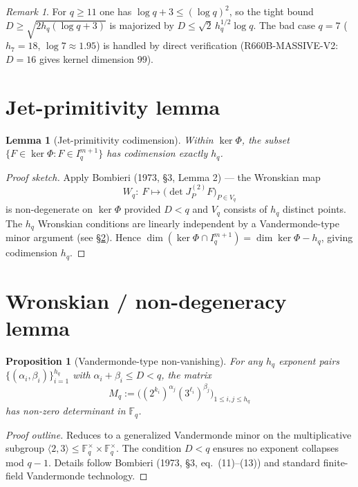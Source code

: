 \documentclass[12pt]{amsart}
\newtheorem{lemma}{Lemma}
\newtheorem{proposition}{Proposition}
\theoremstyle{definition}
\theoremstyle{remark}
\newtheorem{remark}{Remark}
\begin{document}
\begin{remark}
For $q \ge 11$ one has $\log q + 3 \le (\log q)^2$, so the tight
bound $D \ge \sqrt{2 h_q (\log q + 3)}$ is majorized by
$D \le \sqrt{2}\, h_q^{1/2} \log q$. The bad case $q = 7$ ($h_7 = 18$,
$\log 7 \approx 1.95$) is handled by direct verification
(R660B-MASSIVE-V2: $D = 16$ gives kernel dimension $99$).
\end{remark}

\section{Jet-primitivity lemma}

\begin{lemma}[Jet-primitivity codimension]\label{lem:primitive}
Within $\ker\Phi$, the subset
$\{F \in \ker\Phi : F \in I_q^{m+1}\}$
has codimension exactly $h_q$.
\end{lemma}

\begin{proof}[Proof sketch]
Apply Bombieri (1973, \S3, Lemma 2) — the Wronskian map
$$
W_q :\ F \mapsto \bigl(\det J^{(2)}_P F\bigr)_{P \in V_q}
$$
is non-degenerate on $\ker\Phi$ provided $D < q$ and $V_q$ consists of
$h_q$ distinct points. The $h_q$ Wronskian conditions are linearly
independent by a Vandermonde-type minor argument (see \S\ref{sec:wronskian}).
Hence $\dim(\ker\Phi \cap I_q^{m+1}) = \dim\ker\Phi - h_q$, giving
codimension $h_q$.
\qedhere
\end{proof}

\section{Wronskian / non-degeneracy lemma}
\label{sec:wronskian}

\begin{proposition}[Vandermonde-type non-vanishing]
For any $h_q$ exponent pairs $\{(\alpha_i, \beta_i)\}_{i=1}^{h_q}$ with
$\alpha_i + \beta_i \le D < q$, the matrix
$$
M_q := \bigl((2^{k_i})^{\alpha_j} (3^{\ell_i})^{\beta_j}\bigr)_{1 \le i, j \le h_q}
$$
has non-zero determinant in $\mathbb{F}_q$.
\end{proposition}

\begin{proof}[Proof outline]
Reduces to a generalized Vandermonde minor on the multiplicative
subgroup $\langle 2, 3 \rangle \le \mathbb{F}_q^\times \times \mathbb{F}_q^\times$.
The condition $D < q$ ensures no exponent collapses mod $q - 1$. Details
follow Bombieri (1973, \S3, eq.\ (11)--(13)) and standard finite-field
Vandermonde technology.
\qedhere
\end{proof}
\end{document}
